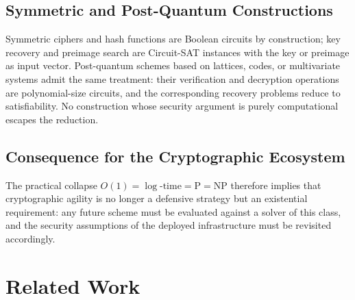 \documentclass[letterpaper,journal]{IEEEtran}
\begin{document}
\subsection{Symmetric and Post-Quantum Constructions}
Symmetric ciphers and hash functions are Boolean circuits by construction;
key recovery and preimage search are Circuit-SAT instances with the key or
preimage as input vector. Post-quantum schemes based on lattices, codes, or
multivariate systems admit the same treatment: their verification and
decryption operations are polynomial-size circuits, and the corresponding
recovery problems reduce to satisfiability. No construction whose security
argument is purely computational escapes the reduction.

\subsection{Consequence for the Cryptographic Ecosystem}
The practical collapse $O(1)=\log\text{-time}=\text{P}=\text{NP}$ therefore
implies that cryptographic agility is no longer a defensive strategy but an
existential requirement: any future scheme must be evaluated against a
solver of this class, and the security assumptions of the deployed
infrastructure must be revisited accordingly.

\section{Related Work}
\label{sec:related}
\end{document}
